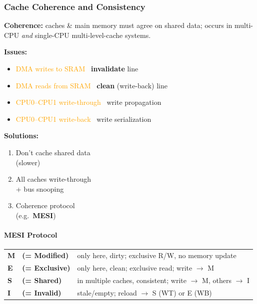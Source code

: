   \subsubsection{Cache Coherence and Consistency}
    \textbf{Coherence:} caches \& main memory must agree on shared data; occurs in multi-CPU \emph{and} single-CPU multi-level-cache systems.

    \begin{minipage}[t]{0.64\columnwidth}
      \textbf{Issues:} 
      \begin{itemize}
        \item \textcolor{orange}{DMA writes to SRAM} \textrightarrow\ \textbf{invalidate} line
        \item \textcolor{orange}{DMA reads from SRAM} \textrightarrow\ \textbf{clean} (write-back) line
        \item \textcolor{orange}{CPU0--CPU1 write-through} \textrightarrow\ write propagation
        \item \textcolor{orange}{CPU0--CPU1 write-back} \textrightarrow\ write serialization
      \end{itemize}
    \end{minipage}\hfill
    \begin{minipage}[t]{0.36\columnwidth}
      \textbf{Solutions:}
      \begin{enumerate}
        \item Don't cache shared data\\(slower)
        \item All caches write-through\\+ bus snooping
        \item Coherence protocol\\(e.g.\ \textbf{MESI})
      \end{enumerate}
    \end{minipage}
    \vspace*{-0.4cm}
    \paragraph{MESI Protocol}
    \small
    \begin{tabular}{@{}lll@{}}
      \textbf{M} & \textbf{(= Modified)}  & only here, dirty; exclusive R/W, no memory update \\
      \textbf{E} & \textbf{(= Exclusive)} & only here, clean; exclusive read; write $\rightarrow$ M \\
      \textbf{S} & \textbf{(= Shared)}    & in multiple caches, consistent; write $\rightarrow$ M, others $\rightarrow$ I \\
      \textbf{I} & \textbf{(= Invalid)}   & stale/empty; reload $\rightarrow$ S (WT) or E (WB) \\
    \end{tabular}

